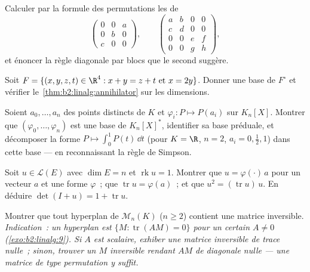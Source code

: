 \begin{exercise}[$\star$]\label{exo:b2:linalg:2}
Calculer par la formule des permutations les  de
\[
\begin{pmatrix} 0 & 0 & a\\ 0 & b & 0\\ c & 0 & 0 \end{pmatrix},
\qquad
\begin{pmatrix}
a & b & 0 & 0\\
c & d & 0 & 0\\
0 & 0 & e & f\\
0 & 0 & g & h
\end{pmatrix},
\]
et énoncer la règle diagonale par blocs que le second suggère.
\end{exercise}

\begin{exercise}[$\star$]\label{exo:b2:linalg:3}
Soit $F = \{(x,y,z,t) \in \R^4 : x + y = z + t \text{ et } x = 2y\}$.
Donner une base de $F^\circ$ et vérifier
le~\cref{thm:b2:linalg:annihilator} sur les dimensions.
\end{exercise}

\begin{exercise}[$\star\star$]\label{exo:b2:linalg:4}
Soient $a_0, \dots, a_n$ des points distincts de $K$ et $\varphi_i \colon
P \mapsto P(a_i)$ sur $K_n[X]$. Montrer que $(\varphi_0, \dots,
\varphi_n)$ est une base de $K_n[X]^*$, identifier sa base préduale,
et décomposer la forme $P \mapsto \int_0^1 P(t)\,\dd t$ (pour $K = \R$,
$n = 2$, $a_i = 0, \frac12, 1$) dans cette base --- en reconnaissant
la règle de Simpson.
\end{exercise}

\begin{exercise}[$\star\star$]\label{exo:b2:linalg:5}
Soit $u \in \mathcal{L}(E)$ avec $\dim E = n$ et $\operatorname{rk} u
= 1$. Montrer que $u = \varphi(\cdot)\, a$ pour un vecteur $a$ et une
forme $\varphi$~; que $\operatorname{tr} u = \varphi(a)$~; et que
$u^2 = (\operatorname{tr} u)\, u$. En déduire $\det(I + u) = 1 +
\operatorname{tr} u$.
\end{exercise}

\begin{exercise}[$\star\star$]\label{exo:b2:linalg:6}
Montrer que tout hyperplan de $\mathcal{M}_n(K)$ ($n \geq 2$)
contient une matrice inversible. \emph{Indication~: un hyperplan est $\{M :
\operatorname{tr}(AM) = 0\}$ pour un certain $A \neq 0$
(\cref{exo:b2:linalg:9}). Si $A$ est scalaire, exhiber une matrice
inversible de trace nulle~; sinon, trouver un $M$ inversible rendant
$AM$ de diagonale nulle --- une matrice de type permutation y suffit.}
\end{exercise}

